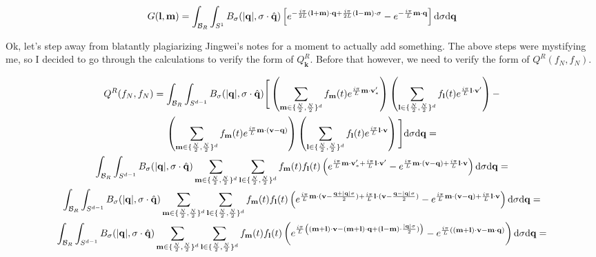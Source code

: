 \documentclass{article}
\def\b{\mathbf}
\def\t{\text}
\begin{document}
\begin{equation} \label{eq:Glm}
    G(\b l, \b m) = \int_{\mathcal{B}_R} \int_{S^{1}} B_{\sigma}(|\b q|, \sigma \cdot \hat{\b q}) \left[ e^{-\frac{i \pi}{2L} \b (\b l + \b m) \cdot \b q + \frac{i \pi}{2L} \b (\b l - \b m) \cdot \b \sigma} - e^{-\frac{i \pi}{L} \b m \cdot \b q } \right] \t d \sigma \t d \b q
\end{equation}

Ok, let's step away from blatantly plagiarizing Jingwei's notes for a moment to actually add something. The above steps were mystifying me, so I decided to go through the calculations to verify the form of $Q^R_{\b k}$. Before that however, we need to verify the form of $Q^R(f_N,f_N)$.

\begin{gather*}
    Q^R(f_N,f_N) = \int_{\mathcal{B}_R} \int_{S^{d-1}} B_{\sigma}(|\b q|, \sigma \cdot \hat{\b q}) \Bigg[ \left(\sum_{\b m \in \{\frac{N}{2}, \frac{N}{2} \}^d} f_{\b m}(t) e^{\frac{i \pi}{L} \b m \cdot \b v'_*} \right) \left(\sum_{\b l \in \{\frac{N}{2}, \frac{N}{2} \}^d} f_{\b l}(t) e^{\frac{i \pi}{L} \b l \cdot \b v'} \right) - \\
    \left(\sum_{\b m \in \{\frac{N}{2}, \frac{N}{2} \}^d} f_{\b m}(t) e^{\frac{i \pi}{L} \b m \cdot (\b v - \b q)} \right) \left(\sum_{\b l \in \{\frac{N}{2}, \frac{N}{2} \}^d} f_{\b l}(t) e^{\frac{i \pi}{L} \b l \cdot \b v} \right) \Bigg] \t d \sigma \t d \b q = \\
    \int_{\mathcal{B}_R} \int_{S^{d-1}} B_{\sigma}(|\b q|, \sigma \cdot \hat{\b q}) \sum_{\b m \in \{\frac{N}{2}, \frac{N}{2} \}^d} \sum_{\b l \in \{\frac{N}{2}, \frac{N}{2} \}^d} f_{\b m}(t) f_{\b l}(t) \left( e^{\frac{i \pi}{L} \b m \cdot \b v'_* + \frac{i \pi}{L} \b l \cdot \b v'}  - e^{\frac{i \pi}{L} \b m \cdot (\b v - \b q) + \frac{i \pi}{L} \b l \cdot \b v} \right) \t d \sigma \t d \b q = \\
    \int_{\mathcal{B}_R} \int_{S^{d-1}} B_{\sigma}(|\b q|, \sigma \cdot \hat{\b q}) \sum_{\b m \in \{\frac{N}{2}, \frac{N}{2} \}^d} \sum_{\b l \in \{\frac{N}{2}, \frac{N}{2} \}^d} f_{\b m}(t) f_{\b l}(t) \left( e^{\frac{i \pi}{L} \b m \cdot (\b v - \frac{\b q + |\b q| \sigma}{2}) + \frac{i \pi}{L} \b l \cdot \b (\b v - \frac{\b q - |\b q| \sigma}{2})}  - e^{\frac{i \pi}{L} \b m \cdot (\b v - \b q) + \frac{i \pi}{L} \b l \cdot \b v} \right) \t d \sigma \t d \b q = \\ 
    \int_{\mathcal{B}_R} \int_{S^{d-1}} B_{\sigma}(|\b q|, \sigma \cdot \hat{\b q}) \sum_{\b m \in \{\frac{N}{2}, \frac{N}{2} \}^d} \sum_{\b l \in \{\frac{N}{2}, \frac{N}{2} \}^d} f_{\b m}(t) f_{\b l}(t) \left( e^{\frac{i \pi}{L} \left( (\b m + \b l) \cdot \b v - (\b m + \b l) \cdot \b q + (\b l - \b m) \cdot \frac{|\b q| \sigma}{2} ) \right)}  - e^{\frac{i \pi}{L} \left( (\b m + \b l) \cdot \b v - \b m \cdot \b q \right)} \right) \t d \sigma \t d \b q = \\ 

\end{gather*}
\end{document}
